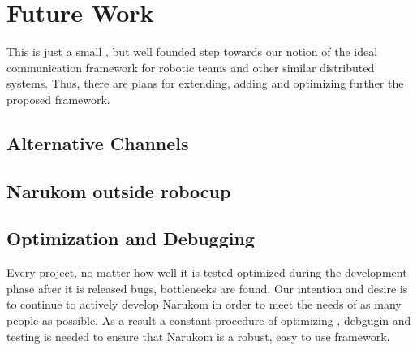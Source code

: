 \chapter{Future Work}
\label{future}
This is just a small , but well founded step towards our notion of the ideal communication framework for robotic teams and other similar distributed systems. Thus, there are plans for extending, adding and optimizing further the proposed framework.
\section{Alternative Channels}


\section{Narukom outside robocup}


\section{Optimization and Debugging}

Every project, no matter how well it is tested optimized during the development phase after it is released bugs, bottlenecks are found. Our intention and desire is to continue to actively develop Narukom in order to meet the needs of as many people as possible. As a result a constant procedure of optimizing , debgugin and testing is needed to ensure that Narukom is a robust, easy to use framework.
